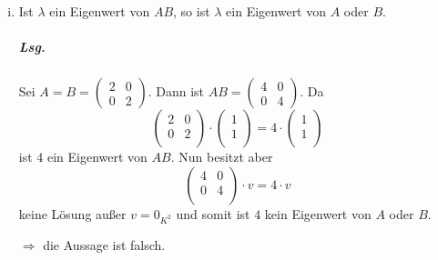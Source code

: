 \documentclass{scrreprt}
\begin{document}
\begin{enumerate}[(i)]
\item Ist $\lambda$ ein Eigenwert von $AB$, so ist $\lambda$ ein Eigenwert von
  $A$ oder $B$.

  \subparagraph{Lsg.} Sei $A = B = \begin{pmatrix}2 & 0 \\0 & 2\end{pmatrix}$.
  Dann ist $AB = \begin{pmatrix}4 & 0\\0 & 4\end{pmatrix}$.
  Da
  \[
    \begin{pmatrix}
      2 & 0 \\
      0 & 2 \\
    \end{pmatrix} \cdot \begin{pmatrix}
      1 \\
      1 \\
    \end{pmatrix} = 4 \cdot \begin{pmatrix}
      1 \\
      1 \\
    \end{pmatrix}
  \]
  ist $4$ ein Eigenwert von $AB$.
  Nun besitzt aber
  \[
    \begin{pmatrix}
      4 & 0 \\
      0 & 4 \\
    \end{pmatrix} \cdot v = 4 \cdot v
  \]
  keine Lösung außer $v = 0_{K^2}$ und somit ist $4$ kein Eigenwert von $A$ oder
  $B$.

  $\Rightarrow$ die Aussage ist falsch.
\end{enumerate}
\newpage
\end{document}
